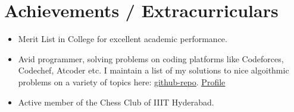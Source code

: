 \documentclass[letterpaper,11pt]{article}
\newcommand{\resumeItem}[1]{
  \item\small{
    {#1 \vspace{-2pt}}
  }
}
\newcommand{\resumeItemListStart}{\begin{itemize}}
\newcommand{\resumeItemListEnd}{\end{itemize}\vspace{-5pt}}
\begin{document}
\section{Achievements / Extracurriculars}
    \resumeItemListStart
        \resumeItem{Merit List in College for excellent academic performance.}
        \resumeItem{Avid programmer, solving problems on coding platforms like Codeforces, Codechef, Atcoder etc. I maintain a list of my solutions to nice algoithmic problems on a variety of topics here: \href{https://github.com/schlechter-afk/competitive-programming}{\underline{\color{blue} github-repo}}. \href{https://codeforces.com/profile/Aegislash04}{\underline{\color{blue}Profile}}}
        \resumeItem{Active member of the Chess Club of IIIT Hyderabad.}
        \resumeItemListEnd
\end{document}
